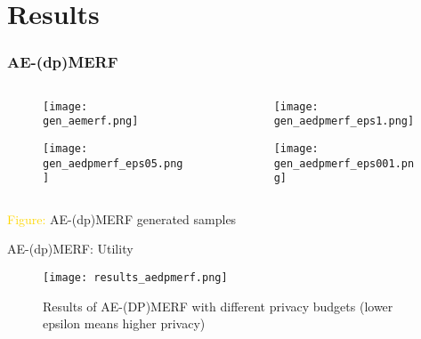 \section{Results}

\begin{frame}
    \frametitle{AE-(dp)MERF}

    \begin{columns}
        \begin{column}{0.48\textwidth}
        \begin{figure}
            \centering
            \texttt{[image: gen\_aemerf.png]}
        \end{figure}
        \begin{figure}[h]
            \centering
            \texttt{[image: gen\_aedpmerf\_eps05.png]}
        \end{figure}
    \end{column}
    \begin{column}{0.48\textwidth}
        \begin{figure}
            \centering
            \texttt{[image: gen\_aedpmerf\_eps1.png]}
        \end{figure}
        \begin{figure}[h]
            \centering
            \texttt{[image: gen\_aedpmerf\_eps001.png]}
        \end{figure}
    \end{column}
    
    \end{columns}
    \centering
    \textcolor{gold}{Figure:} AE-(dp)MERF generated samples

\end{frame}

\begin{frame}{AE-(dp)MERF: Utility}
    \begin{figure}
        \centering
        \texttt{[image: results\_aedpmerf.png]}
        \caption{Results of AE-(DP)MERF with different privacy budgets (lower epsilon means higher privacy)}
        \label{fig:enter-label}
    \end{figure}
\end{frame}

